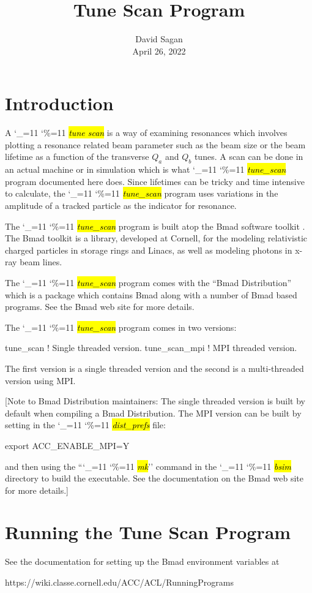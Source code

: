 \documentclass{hitec}
\title{Tune Scan Program}
\author{}
\date{David Sagan \\ April 26, 2022}
\newcommand\dottcmd[1]{\hl{\em#1}\endgroup}
\newcommand{\vn}{\begingroup\catcode`\_=11 \catcode`\%=11 \dottcmd}
\newcommand{\ts}{\vn{tune_scan}\xspace}
\newcommand{\Section}[1]{\section{#1}\vspace*{-1ex}}
\begin{document}
\maketitle

\tableofcontents


\Section{Introduction} 
\label{s:intro}

A \vn{tune scan} is a way of examining resonances which involves plotting a resonance related beam
parameter such as the beam size or the beam lifetime as a function of the transverse $Q_a$ and $Q_b$
tunes.  A scan can be done in an actual machine or in simulation which is what \ts program documented here
does. Since lifetimes can be tricky and time intensive to calculate, the \ts program uses variations in the
amplitude of a tracked particle as the indicator for resonance.

The \ts program is built atop the Bmad software toolkit \cite{b:bmad}. The Bmad toolkit is a
library, developed at Cornell, for the modeling relativistic charged particles in storage rings and
Linacs, as well as modeling photons in x-ray beam lines.

The \ts program comes with the ``Bmad Distribution'' which is a package which contains Bmad along with
a number of Bmad based programs. See the Bmad web site for more details.

The \ts program comes in two versions: 
\begin{code}
tune_scan      ! Single threaded version.
tune_scan_mpi  ! MPI threaded version.
\end{code}
The first version is a single threaded version and the second is a multi-threaded version using MPI.

[Note to Bmad Distribution maintainers: The single threaded version is built by default when compiling a Bmad
Distribution. The MPI version can be built by setting in the \vn{dist_prefs} file:
\begin{code}
  export ACC_ENABLE_MPI=Y
\end{code}
and then using the ``\vn{mk}'' command in the \vn{bsim} directory to build the executable. See the
documentation on the Bmad web site for more details.]

\Section{Running the Tune Scan Program} 
\label{s:run}

See the documentation for setting up the Bmad environment variables at
\begin{code}
https://wiki.classe.cornell.edu/ACC/ACL/RunningPrograms
\end{code}
\end{document}
